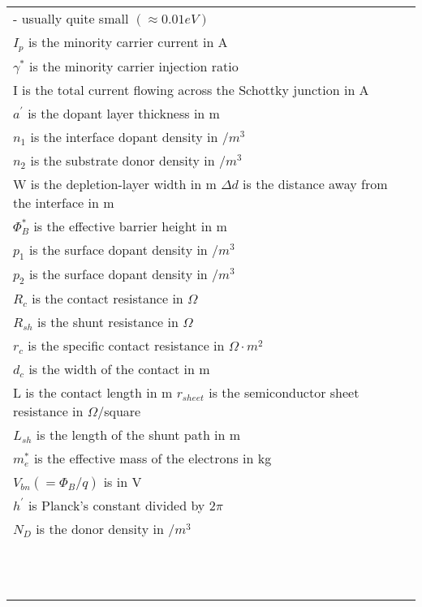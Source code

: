 \documentclass[10pt,landscape]{article}
\begin{document}
\begin{multicols}{3}
\begin{tabular}{@{}ll@{}}
- usually quite small $(\approx 0.01eV)$  \\
$I_p$ is the minority carrier current in A \\
$ \gamma^*$ is the minority carrier injection ratio \\
I is the total current flowing across the Schottky junction in A \\
$a^{\prime}$ is the dopant layer thickness in m \\
$ n_1$ is the interface dopant density in $/m^3$ \\
$n_2$ is the substrate donor density in $/m^3$ \\
W is the depletion-layer width in m
$ \Delta d$ is the distance away from the interface in m \\
$ \Phi^*_B$ is the effective barrier height in m \\
$ p_1$ is the surface dopant density in $/m^3$ \\
$ p_2$ is the surface dopant density in $/m^3$ \\
$ R_c$ is the contact resistance in $\Omega$ \\
$ R_{sh}$ is the shunt resistance in $\Omega$ \\
$ r_c$ is the specific contact resistance in $\Omega\cdot m^2$ \\
$ d_c$ is the width of the contact in m \\
L is the contact length in m
$ r_{sheet}$ is the semiconductor sheet resistance in $\Omega$/square \\
$ L_{sh}$ is the length of the shunt path in m \\
$ m^*_e$ is the effective mass of the electrons in kg \\
$ V_{bn} (=\Phi_B/q)$ is in V \\
$ h^{\prime}$ is Planck's constant divided by $2\pi$ \\
$ N_D$ is the donor density in $/m^3$ \\
$ $ \\
$ $ \\
$ $ \\
$ $ \\
$ $ \\
$ $ \\
$ $ \\
$ $ \\
$ $ \\
$ $ \\
$ $ \\
$ $ \\
\end{tabular}


\end{multicols}
\end{document}
